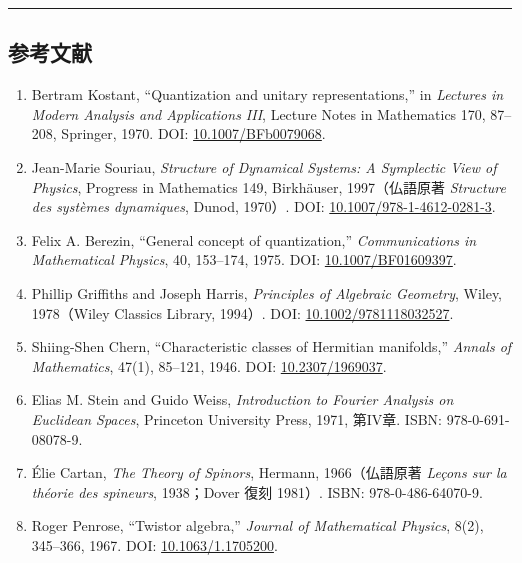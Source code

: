 \documentclass[
  a4paper,
]{ltjsarticle}
\providecommand{\tightlist}{%
  \setlength{\itemsep}{0pt}\setlength{\parskip}{0pt}}
\begin{document}
\begin{center}\rule{0.5\linewidth}{0.5pt}\end{center}

\subsection{参考文献}\label{ux53c2ux8003ux6587ux732e}

\begin{enumerate}
\def\labelenumi{\arabic{enumi}.}
\tightlist
\item
  Bertram Kostant, ``Quantization and unitary representations,'' in
  \emph{Lectures in Modern Analysis and Applications III}, Lecture Notes
  in Mathematics 170, 87--208, Springer, 1970. DOI:
  \href{https://doi.org/10.1007/BFb0079068}{10.1007/BFb0079068}.
\item
  Jean-Marie Souriau, \emph{Structure of Dynamical Systems: A Symplectic
  View of Physics}, Progress in Mathematics 149, Birkhäuser,
  1997（仏語原著 \emph{Structure des systèmes dynamiques}, Dunod,
  1970）. DOI:
  \href{https://doi.org/10.1007/978-1-4612-0281-3}{10.1007/978-1-4612-0281-3}.
\item
  Felix A. Berezin, ``General concept of quantization,''
  \emph{Communications in Mathematical Physics}, 40, 153--174, 1975.
  DOI: \href{https://doi.org/10.1007/BF01609397}{10.1007/BF01609397}.
\item
  Phillip Griffiths and Joseph Harris, \emph{Principles of Algebraic
  Geometry}, Wiley, 1978（Wiley Classics Library, 1994）. DOI:
  \href{https://doi.org/10.1002/9781118032527}{10.1002/9781118032527}.
\item
  Shiing-Shen Chern, ``Characteristic classes of Hermitian manifolds,''
  \emph{Annals of Mathematics}, 47(1), 85--121, 1946. DOI:
  \href{https://doi.org/10.2307/1969037}{10.2307/1969037}.
\item
  Elias M. Stein and Guido Weiss, \emph{Introduction to Fourier Analysis
  on Euclidean Spaces}, Princeton University Press, 1971, 第IV章. ISBN:
  978-0-691-08078-9.
\item
  Élie Cartan, \emph{The Theory of Spinors}, Hermann, 1966（仏語原著
  \emph{Leçons sur la théorie des spineurs}, 1938；Dover 復刻 1981）.
  ISBN: 978-0-486-64070-9.
\item
  Roger Penrose, ``Twistor algebra,'' \emph{Journal of Mathematical
  Physics}, 8(2), 345--366, 1967. DOI:
  \href{https://doi.org/10.1063/1.1705200}{10.1063/1.1705200}.
\end{enumerate}
\end{document}
